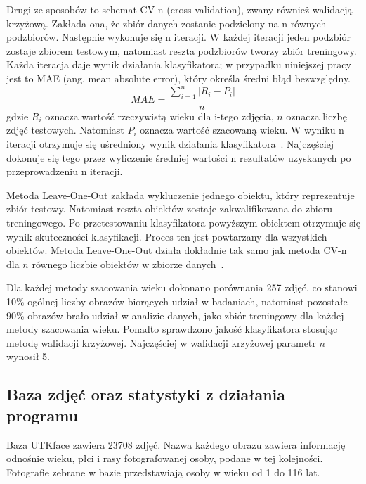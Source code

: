 \documentclass[a4paper,twoside,12pt]{book}
\begin{document}
    Drugi ze sposobów to schemat CV-n (cross validation), zwany również walidacją krzyżową.
    Zakłada ona, że zbiór danych zostanie podzielony na n równych podzbiorów.
    Następnie wykonuje się n iteracji. W każdej iteracji jeden podzbiór zostaje zbiorem testowym, natomiast reszta
    podzbiorów tworzy zbiór treningowy.
    Każda iteracja daje wynik działania klasyfikatora; w przypadku niniejszej pracy jest to
    MAE (ang. mean absolute error), który określa średni błąd bezwzględny.
    \large
    \begin{equation}
        MAE = \frac{\sum_{i=1}^{n}\left | R_{i}-P_{i} \right |}{n}
        \label{wzor.mae}
    \end{equation}
    \normalsize
    gdzie $R_{i}$ oznacza wartość rzeczywistą wieku dla i-tego zdjęcia, $n$ oznacza liczbę zdjęć testowych. %
    Natomiast $P_{i}$ oznacza wartość szacowaną wieku.
    W wyniku n iteracji otrzymuje się uśredniony wynik działania klasyfikatora~\cite{dataMiningAlgorithms}.
    Najczęściej dokonuje się tego przez wyliczenie średniej wartości n rezultatów uzyskanych po przeprowadzeniu
    n iteracji.

    Metoda Leave-One-Out zakłada wykluczenie jednego obiektu, który reprezentuje zbiór testowy. Natomiast reszta obiektów zostaje zakwalifikowana do zbioru treningowego.
    Po przetestowaniu klasyfikatora powyższym obiektem otrzymuje się wynik skuteczności klasyfikacji. Proces ten jest powtarzany dla wszystkich obiektów.
    Metoda Leave-One-Out działa dokładnie tak samo jak metoda CV-n dla $n$ równego liczbie obiektów
    w zbiorze danych~\cite{dataMiningAlgorithms}.

    Dla każdej metody szacowania wieku dokonano porównania 257 zdjęć, co stanowi 10\% ogólnej liczby obrazów biorących
    udział w
    badaniach, natomiast pozostałe 90\% obrazów brało udział w analizie danych, jako zbiór treningowy dla każdej metody
    szacowania wieku.
    Ponadto sprawdzono jakość klasyfikatora stosując metodę walidacji krzyżowej. Najczęściej w walidacji krzyżowej
    parametr $n$ wynosił 5.


    \subsection*{Baza zdjęć oraz statystyki z działania programu}
    Baza UTKface zawiera 23708 zdjęć.
    Nazwa każdego obrazu zawiera informację odnośnie wieku, płci i rasy fotografowanej osoby, podane w tej kolejności.
    Fotografie zebrane w bazie przedstawiają osoby w wieku od 1 do 116 lat.
\end{document}
